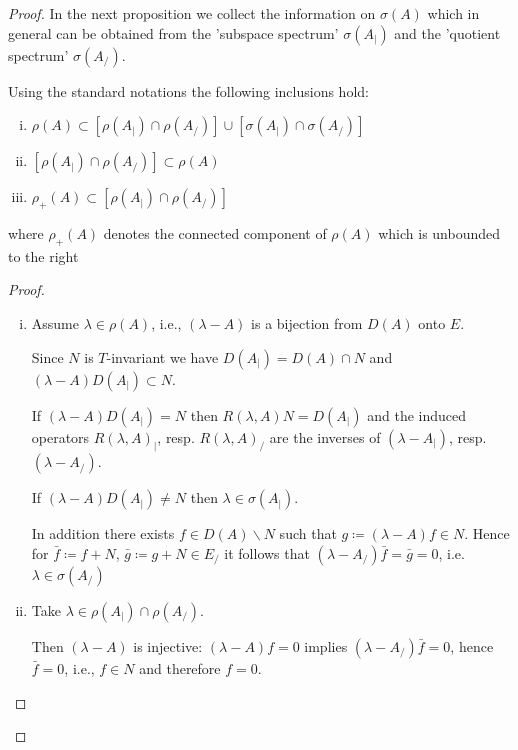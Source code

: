 \begin{proof}
In the next proposition we collect the information on $\sigma(A)$ which in general can be obtained from the 'subspace spectrum' $\sigma(A_{|})$ and the 'quotient spectrum' $\sigma(A_{/})$.

\begin{proposition}\label{prop:a3-4.2}
	
	Using the standard notations the following inclusions hold:
	\begin{enumerate}[(i)]
		\item $\rho(A) \subset [\rho(A_{|}) \cap \rho(A_{/})] \cup [\sigma(A_{|}) \cap \sigma(A_{/})]$
		
		\item $[\rho(A_{|}) \cap \rho(A_{/})] \subset \rho(A) $
		
		\item $\rho_{+}(A) \subset [\rho(A_{|}) \cap \rho(A_{/})]$
	\end{enumerate}		
	 where $\rho_{+}(A)$ denotes the connected component of $\rho(A)$ which is unbounded to the right
	
\end{proposition}

\begin{proof}
	\begin{enumerate}[(i)]
		\item Assume $\lambda \in \rho(A)$, i.e., $(\lambda-A)$ is a bijection from $D(A)$ onto $E$.
		
		Since $N$ is $T$-invariant we have $D(A_{|}) = D(A) \cap N$ and $(\lambda-A)D(A_{|}) \subset N$.
		
		If $(\lambda-A)D(A_{|}) = N$ then $R(\lambda,A)N = D(A_{|})$ and the induced operators $R(\lambda,A)_{|}$, resp. $R(\lambda,A)_{/}$ are the inverses of $(\lambda-A_{|})$, resp. $(\lambda-A_{/})$.
		
		If $(\lambda-A)D(A_{|}) \neq N$ then $\lambda \in \sigma(A_{|})$.
		
		In addition there exists $f \in D(A)\backslash N$ such that $g \coloneqq (\lambda-A)f \in N$.
		Hence for $\bar{f} \coloneqq f+N$, $\bar{g} \coloneqq g+N \in E_{/}$ it follows that $(\lambda-A_{/})\bar{f} = \bar{g} = 0$, i.e. $\lambda \in \sigma(A_{/})$
		
		\item Take $\lambda \in \rho(A_{|}) \cap \rho(A_{/})$.
		
		Then $(\lambda-A)$ is injective: $(\lambda-A)f = 0$ implies $(\lambda-A_{/})\bar{f}= 0$, hence $\bar{f} = 0$, i.e., $f \in N$ and therefore $f = 0$.


\end{enumerate}
\end{proof}
\end{proof}
